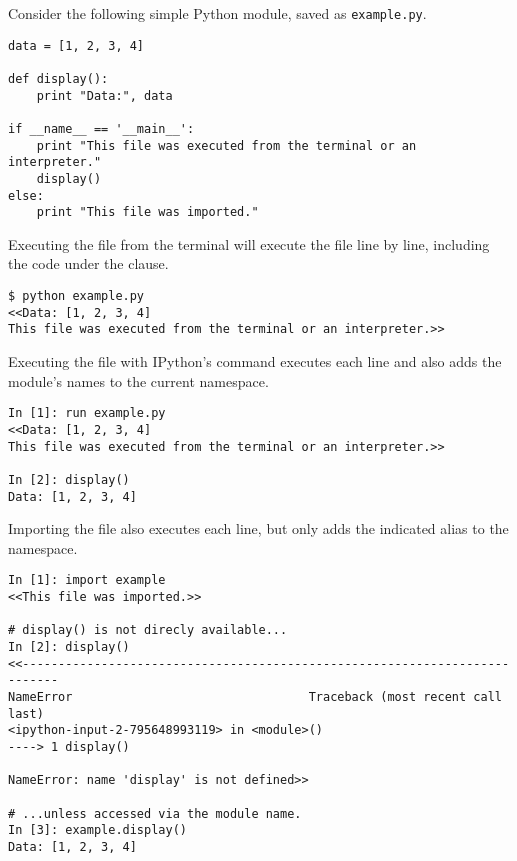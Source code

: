 Consider the following simple Python module, saved as \texttt{example.py}.
\begin{lstlisting}
data = [1, 2, 3, 4]

def display():
    print "Data:", data

if __name__ == '__main__':
    print "This file was executed from the terminal or an interpreter."
    display()
else:
    print "This file was imported."
\end{lstlisting}


Executing the file from the terminal will execute the file line by line, including the code under the  clause.

\begin{lstlisting}
$ python example.py
<<Data: [1, 2, 3, 4]
This file was executed from the terminal or an interpreter.>>
\end{lstlisting}

Executing the file with IPython's  command executes each line and also adds the module's names to the current namespace.

\begin{lstlisting}
In [1]: run example.py
<<Data: [1, 2, 3, 4]
This file was executed from the terminal or an interpreter.>>

In [2]: display()
Data: [1, 2, 3, 4]
\end{lstlisting}

Importing the file also executes each line, but only adds the indicated alias to the namespace.

\begin{lstlisting}
In [1]: import example
<<This file was imported.>>

# display() is not direcly available...
In [2]: display()
<<---------------------------------------------------------------------------
NameError                                 Traceback (most recent call last)
<ipython-input-2-795648993119> in <module>()
----> 1 display()

NameError: name 'display' is not defined>>

# ...unless accessed via the module name.
In [3]: example.display()
Data: [1, 2, 3, 4]
\end{lstlisting}

